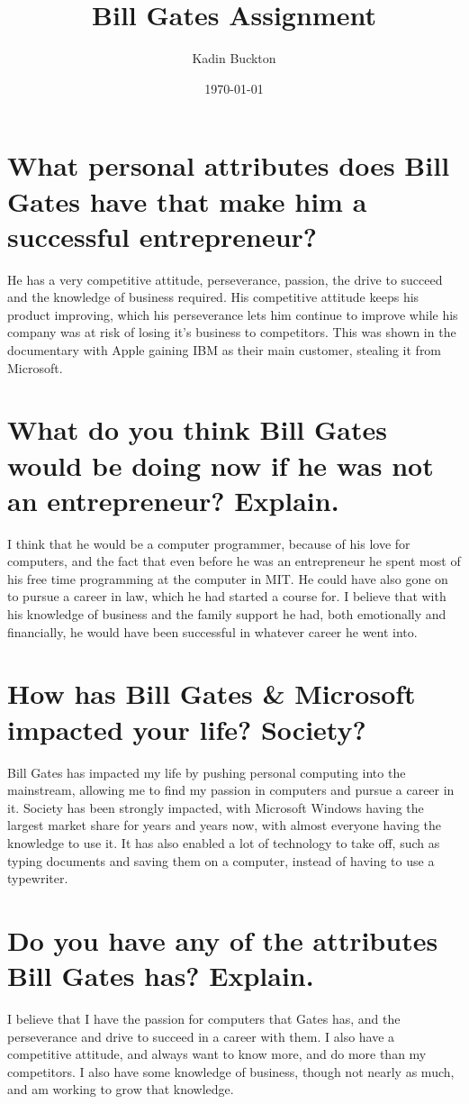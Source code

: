 \documentclass[11pt]{article}
\author{Kadin Buckton}
\date{\today}
\title{Bill Gates Assignment}
\begin{document}
\maketitle

\section*{What personal attributes does Bill Gates have that make him a successful entrepreneur?}
\label{sec:orgdfdc3df}
He has a very competitive attitude, perseverance, passion, the drive to succeed and the knowledge of business required. His competitive attitude keeps his product improving, which his perseverance lets him continue to improve while his company was at risk of losing it's business to competitors. This was shown in the documentary with Apple gaining IBM as their main customer, stealing it from Microsoft.

\section*{What do you think Bill Gates would be doing now if he was not an entrepreneur? Explain.}
\label{sec:org38fd050}
I think that he would be a computer programmer, because of his love for computers, and the fact that even before he was an entrepreneur he spent most of his free time programming at the computer in MIT. He could have also gone on to pursue a career in law, which he had started a course for. I believe that with his knowledge of business and the family support he had, both emotionally and financially, he would have been successful in whatever career he went into.

\section*{How has Bill Gates \& Microsoft impacted your life? Society?}
\label{sec:orgb1d0bc2}
Bill Gates has impacted my life by pushing personal computing into the mainstream, allowing me to find my passion in computers and pursue a career in it. Society has been strongly impacted, with Microsoft Windows having the largest market share for years and years now, with almost everyone having the knowledge to use it. It has also enabled a lot of technology to take off, such as typing documents and saving them on a computer, instead of having to use a typewriter.

\section*{Do you have any of the attributes Bill Gates has? Explain.}
\label{sec:org4bd466a}
I believe that I have the passion for computers that Gates has, and the perseverance and drive to succeed in a career with them. I also have a competitive attitude, and always want to know more, and do more than my competitors. I also have some knowledge of business, though not nearly as much, and am working to grow that knowledge.
\end{document}
